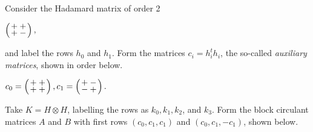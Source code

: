 \documentclass[../../../main]{subfiles}
\begin{document}
\begin{ex}\label{bal-had-ex2}
 Consider the Hadamard matrix of order 2
 \begin{defenum}
  \item $
  \arraycolsep=1.25pt\def\arraystretch{0.625}
  \left(\begin{array}{cc}
   +&+\\+&-
  \end{array}\right),
  $
 \end{defenum}
 and label the rows $h_0$ and $h_1$. Form the matrices $c_i=h_i^th_i$, the so-called {\it auxiliary matrices}, shown in order below.
 \begin{defenum}[resume]
  \item $
  c_0=
  \arraycolsep=1.25pt\def\arraystretch{0.625}
  \left(\begin{array}{cc}
   +&+\\+&+
  \end{array}\right),
  c_1=
  \arraycolsep=1.25pt\def\arraystretch{0.625}
  \left(\begin{array}{cc}
   +&-\\-&+
  \end{array}\right).
  $
 \end{defenum}
 Take $K=H \otimes H$, labelling the rows as $k_0,k_1,k_2$, and $k_3$. Form the block circulant matrices $A$ and $B$ with first rows $(c_0,c_1,c_1)$ and $(c_0,c_1,-c_1)$, shown below.
\end{ex}
\end{document}
